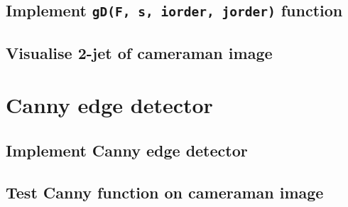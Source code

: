 \documentclass[abstract=true]{scrartcl}
\begin{document}
    \subsection{Implement \texttt{gD(F, s, iorder, jorder)} function}

    \subsection{Visualise 2-jet of cameraman image}



\section{Canny edge detector}

    \subsection{Implement Canny edge detector}

    \subsection{Test Canny function on cameraman image}


\end{document}
